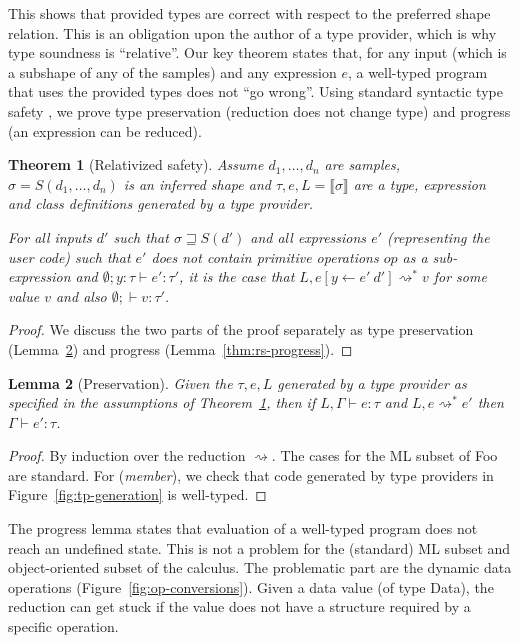 \documentclass[10pt,preprint,blind,clearpagebib]{sigplanconf}
\newcommand{\ident}[1]{\textnormal{\sffamily #1}}
\newcommand{\reduce}{\rightsquigarrow}
\newcommand{\sem}[1]{\llbracket #1 \rrbracket}
\newcommand{\semalt}[1]{S(#1)}
\newtheorem{theorem}{Theorem}
\newtheorem{lemma}[theorem]{Lemma}
\begin{document}
\noindent
This shows that provided types are correct with respect to the preferred shape relation. 
This is an obligation upon the author of a type provider, which is why
type soundness is ``relative''.
Our key theorem states that, for any input (which is a subshape of any of the samples) and 
any expression $e$, a well-typed program that uses the provided types does not ``go wrong''.
Using standard syntactic type safety  \cite{syntactic}, we prove type preservation 
(reduction does not change type) and progress (an expression can be reduced).

\begin{theorem}[Relativized safety]
\label{thm:safety}
Assume $d_1, \ldots, d_n$ are samples, $\sigma=\semalt{d_1, \ldots, d_n}$ is an inferred
shape and $\tau,e,L = \sem{\sigma}$ are a type, expression and class definitions generated by a 
type provider.

For all inputs $d'$ such that $\sigma \sqsupseteq \semalt{d'}$ and all expressions $e'$
(representing the user code) such that $e'$ does not contain primitive operations $op$ as a sub-expression and
$\emptyset; y\!:\!\tau \vdash e'\!:\!\tau'$, it is the case that $L, e[y\leftarrow e'~d'] \reduce^{*} v$ for some value $v$ and
also $\emptyset; \vdash v : \tau'$.
\end{theorem}
\begin{proof}
We discuss the two parts of the proof separately as type preservation (Lemma~\ref{thm:rs-preservation})
and progress (Lemma~\ref{thm:rs-progress}).
\end{proof}

\begin{lemma}[Preservation]
\label{thm:rs-preservation}
Given the $\tau, e, L$ generated by a type provider as specified in
the assumptions of Theorem~\ref{thm:safety}, then if $L, \Gamma \vdash e : \tau$ and 
$L, e \reduce^{*} e'$ then $\Gamma \vdash e' : \tau$.
\end{lemma}
\begin{proof}
By induction over the reduction $\reduce$. The cases for the ML subset of Foo 
are standard. For (\emph{member}), we check that code generated by type providers
in Figure~\ref{fig:tp-generation} is well-typed.
\end{proof}

\noindent
The progress lemma states that evaluation of a well-typed program does not reach an undefined state. 
This is not a problem for the (standard) ML subset and object-oriented subset of the calculus. The 
problematic part are the dynamic data operations (Figure~\ref{fig:op-conversions}). Given a data
value (of type \ident{Data}), the reduction can get stuck if the value does not have a structure 
required by a specific operation.
\end{document}
